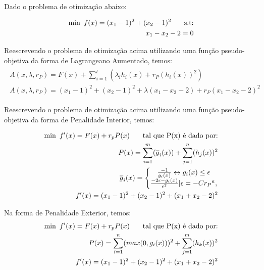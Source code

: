 \documentclass[a4paper, 12pt]{article}
\begin{document}
Dado o problema de otimização abaixo:

\begin{align*}
\begin{split}
\text{min\phantom{0}} f(x) = (x_1 - 1)^2 + (x_2 - 1)^2 \text{\phantom{000} s.t:} \\
x_1 - x_2 - 2 = 0
\end{split}
\end{align*}

Reescrevendo o problema de otimização acima utilizando uma função pseudo-objetiva da forma de Lagrangeano Aumentado, temos:
\begin{align*}
\begin{split}
A(x, \lambda, r_P) = F(x) + \sum_{i=1}^{l} (\lambda_i h_i(x) + r_P (h_i(x))^2) \\
A(x, \lambda, r_P) = (x_1 - 1)^2 + (x_2 - 1)^2 + \lambda (x_1 - x_2 - 2) + r_P (x_1 - x_2 - 2)^2
\end{split}
\end{align*}

Reescrevendo o problema de otimização acima utilizando uma função pseudo-objetiva da forma de Penalidade Interior, temos:

\begin{align*}
\begin{split}
\text{min\phantom{0}} f'(x) = F(x) + r_p P(x) \text{\phantom{000} tal que P(x) é dado por:} \\
P(x) = \sum_{i=1}^{m} (\overline g_i(x)) +  \sum_{j=1}^{n} (h_j(x))^2 \\
\overline g_i(x) = 
\left\{\begin{matrix}
\frac{-1}{g_i(x)} \leftrightarrow g_i(x) \leq  \epsilon  \\ 
\frac{-2 \epsilon - g_i(x)}{\epsilon^2} | \epsilon = -C {r_P}^a, 
\end{matrix}\right. \\
f'(x) = (x_1-1)^2 + (x_2-1)^2 + (x_1+x_2-2)^2
\end{split}
\end{align*}

Na forma de Penalidade Exterior, temos:
\begin{align*}
\begin{split}
\text{min\phantom{0}} f'(x) = F(x) + r_p P(x) \text{\phantom{000} tal que P(x) é dado por:} \\
P(x) = \sum_{i=1}^{n} (max(0,g_i(x)))^2 + \sum_{j=1}^{m} (h_k(x))^2 \\
f'(x) = (x_1-1)^2 + (x_2-1)^2 + (x_1+x_2-2)^2
\end{split}
\end{align*}
\end{document}
